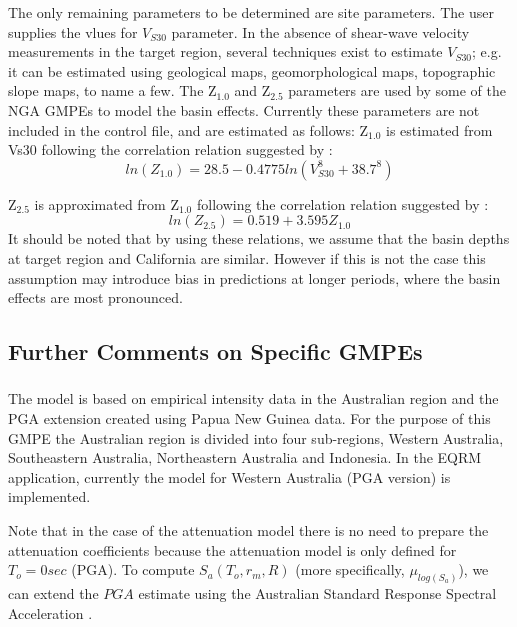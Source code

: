 The only remaining parameters to be determined are site parameters.
The user supplies the vlues for $V_{S30}$ parameter. In the absence
of shear-wave velocity measurements in the target region, several
techniques exist to estimate $V_{S30}$; e.g. it can be estimated
using geological maps, geomorphological maps, topographic slope
maps, to name a few. The Z$_{1.0}$ and Z$_{2.5}$ parameters are used
by some of the NGA GMPEs to model the basin effects. Currently these
parameters are not included in the control file, and are estimated
as follows: Z$_{1.0}$ is estimated from Vs30 following the
correlation relation suggested by \citet{eqrm_Chiou08}:
\begin{equation}
ln(Z_{1.0}) = 28.5-0.4775ln(V_{S30}^8+38.7^8)
\end{equation}

Z$_{2.5}$ is approximated from Z$_{1.0}$ following the correlation
relation suggested by \citet{eqrm_Campbell07}:
\begin{equation}
ln(Z_{2.5}) = 0.519+3.595Z_{1.0}
\end{equation}
It should be noted that by using these relations, we assume that the
basin depths at target region and California are similar. However if
this is not the case this assumption may introduce bias in
predictions at longer periods, where the basin effects are most
pronounced.

\subsection{Further Comments on Specific GMPEs}

\subsubsection{\citet{eqrm_Gaull90a}}
The \citet{eqrm_Gaull90a} model is based on empirical intensity data
in the Australian region and the PGA extension created using Papua
New Guinea data. For the purpose of this GMPE the Australian region
is divided into four sub-regions, Western Australia, Southeastern
Australia, Northeastern Australia and Indonesia. In the EQRM
application, currently the model for Western Australia (PGA version)
is implemented.

Note that in the case of the \citet{eqrm_Gaull90a} attenuation model
there is no need to prepare the attenuation coefficients because the
attenuation model is only defined for $T_o=0 sec$ (PGA). To compute
$S_a(T_o,r_m,R)$ (more specifically, $\mu_{log(S_a)}$), we can
extend the $PGA$ estimate using the Australian Standard Response
Spectral Acceleration \citep{eqrm_Aus93}.

